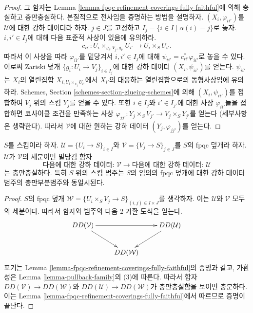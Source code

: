 \begin{proof}
그 함자는 Lemma \ref{lemma-fpqc-refinement-coverings-fully-faithful}에
의해 충실하고 충만충실하다. 본질적으로 전사임을 증명하는 방법을
설명하자. $(X_i, \varphi_{ii'})$를 $\mathcal{U}$에 대한 강하
데이터라 하자. $j \in J$를 고정하고
$I_j = \{i \in I \mid \alpha(i) = j\}$로 놓자. $i, i' \in I_j$에
대해 다음 표준적 사상이 있음에 유의하라.
$$
c_{ii'} : U_i \times_{g_i, V_j, g_{i'}} U_{i'} \to U_i \times_S U_{i'}.
$$
따라서 이 사상을 따라 $\varphi_{ii'}$를 밑당겨서 $i, i' \in I_j$에
대해 $\psi_{ii'} = c_{ii'}^*\varphi_{ii'}$로 놓을 수 있다. 이로써
Zariski 덮개 $\{g_i : U_i \to V_j\}_{i \in I_j}$에 대한 강하 데이터
$(X_i, \psi_{ii'})$를 얻는다. $\psi_{ii'}$는 $X_i$의 열린집합
$X_{i, U_i \times_{V_j} U_{i'}}$에서 $X_{i'}$의 대응하는 열린집합으로의
동형사상임에 유의하라. Schemes, Section
\ref{schemes-section-glueing-schemes}에 의해 $(X_i, \psi_{ii'})$를
접합하여 $V_j$ 위의 스킴 $Y_j$를 얻을 수 있다. 또한 $i \in I_j$와
$i' \in I_{j'}$에 대한 사상 $\varphi_{ii'}$들을 접합하면 코사이클
조건을 만족하는 사상
$\varphi_{jj'} : Y_j \times_S V_{j'} \to V_j \times_S Y_{j'}$를 얻는다
(세부사항은 생략한다). 따라서 $\mathcal{V}$에 대한 원하는 강하
데이터 $(Y_j, \varphi_{jj'})$를 얻는다.
\end{proof}

\begin{lemma}
\label{lemma-refine-coverings-fully-faithful}
$S$를 스킴이라 하자. $\mathcal{U} = \{U_i \to S\}_{i \in I}$와
$\mathcal{V} = \{V_j \to S\}_{j \in J}$를 $S$의 fpqc 덮개라 하자.
$\mathcal{U}$가 $\mathcal{V}$의 세분이면 밑당김 함자
$$
\text{다음에 대한 강하 데이터: }
\mathcal{V}
\longrightarrow
\text{다음에 대한 강하 데이터: }
\mathcal{U}
$$
는 충만충실하다. 특히 $S$ 위의 스킴 범주는 $S$의 임의의 fpqc 덮개에
대한 강하 데이터 범주의 충만부분범주와 동일시된다.
\end{lemma}

\begin{proof}
$S$의 fpqc 덮개
$\mathcal{W} = \{U_i \times_S V_j \to S\}_{(i, j) \in I \times J}$를
생각하자. 이는 $\mathcal{U}$와 $\mathcal{V}$ 모두의 세분이다. 따라서
함자와 범주의 다음 $2$-가환 도식을 얻는다.
$$
\xymatrix{
DD(\mathcal{V}) \ar[rd] \ar[rr] & & DD(\mathcal{U}) \ar[ld] \\
& DD(\mathcal{W}) &
}
$$
표기는 Lemma \ref{lemma-fpqc-refinement-coverings-fully-faithful}의 증명과
같고, 가환성은 Lemma \ref{lemma-pullback-family}의 (3)에 따른다. 따라서
함자 $DD(\mathcal{V}) \to DD(\mathcal{W})$와
$DD(\mathcal{U}) \to DD(\mathcal{W})$가 충만충실함을 보이면 충분하다.
이는 Lemma \ref{lemma-fpqc-refinement-coverings-fully-faithful}에서
따르므로 증명이 끝난다.
\end{proof}

